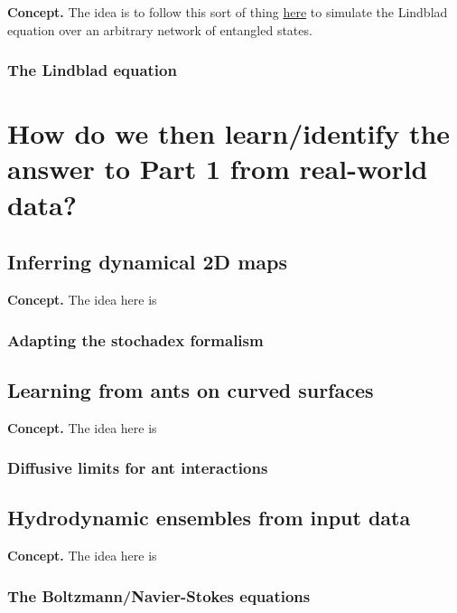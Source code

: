 \documentclass{book}
\begin{document}
{\bfseries\sffamily Concept.} The idea is to follow this sort of thing \href{https://en.wikipedia.org/wiki/Quantum_jump_method}{here} to simulate the Lindblad equation over an arbitrary network of entangled states.

\section{\sffamily The Lindblad equation}


\part*{{ How do we then learn/identify the answer to Part 1 from real-world data?}}


\chapter{\sffamily Inferring dynamical 2D maps}

{\bfseries\sffamily Concept.} The idea here is 


\section{\sffamily Adapting the stochadex formalism}

\chapter{\sffamily Learning from ants on curved surfaces}

{\bfseries\sffamily Concept.} The idea here is 

\section{\sffamily Diffusive limits for ant interactions}


\chapter{\sffamily Hydrodynamic ensembles from input data}

{\bfseries\sffamily Concept.} The idea here is 


\section{\sffamily The Boltzmann/Navier-Stokes equations}
\end{document}
